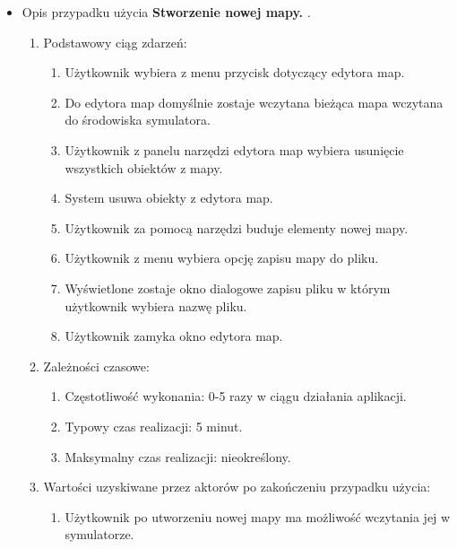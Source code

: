 \begin{par}
\begin{itemize}
	\item
	Opis przypadku użycia {\bf Stworzenie nowej mapy. }.
	\begin{enumerate}
	\item Podstawowy ciąg zdarzeń:
		\begin{enumerate}
		\item Użytkownik wybiera z menu przycisk dotyczący edytora map.
		\item Do edytora map domyślnie zostaje wczytana bieżąca mapa wczytana do środowiska symulatora.
		\item Użytkownik z panelu narzędzi edytora map wybiera usunięcie wszystkich obiektów z mapy.
		\item System usuwa obiekty z edytora map.
		\item Użytkownik za pomocą narzędzi buduje elementy nowej mapy.
		\item Użytkownik z menu wybiera opcję zapisu mapy do pliku.
		\item Wyświetlone zostaje okno dialogowe zapisu pliku w którym użytkownik wybiera nazwę pliku.
		\item Użytkownik zamyka okno edytora map.
		\end{enumerate}
	\item Zależności czasowe:
		\begin{enumerate}
		\item Częstotliwość wykonania: 0-5 razy w ciągu działania aplikacji.
		\item Typowy czas realizacji: 5 minut.
		\item Maksymalny czas realizacji: nieokreślony.
		\end{enumerate}
	\item Wartości uzyskiwane przez aktorów po zakończeniu przypadku użycia:
		\begin{enumerate}
		\item Użytkownik po utworzeniu nowej mapy ma możliwość wczytania jej w symulatorze.
		\end{enumerate}
	\end{enumerate}
	\end{itemize}
\end{par}

